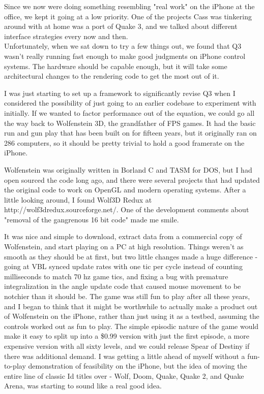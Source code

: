 Since we now were doing something resembling "real work" on the iPhone at the office, we kept it going at a low priority.  One of the projects Cass was tinkering around with at home was a port of Quake 3, and we talked about different interface strategies every now and then.\\
Unfortunately, when we sat down to try a few things out, we found that Q3 wasn't really running fast enough to make good judgments on iPhone control systems.  The hardware should be capable enough, but it will take some architectural changes to the rendering code to get the most out of it.\\
\par

I was just starting to set up a framework to significantly revise Q3 when I considered the possibility of just going to an earlier codebase to experiment with initially.  If we wanted to factor performance out of the equation, we could go all the way back to Wolfenstein 3D, the grandfather of FPS games.  It had the basic run and gun play that has been built on for fifteen years, but it originally ran on 286 computers, so it should be pretty trivial to hold a good framerate on the iPhone.\\
\par

Wolfenstein was originally written in Borland C and TASM for DOS, but I had open sourced the code long ago, and there were several projects that had updated the original code to work on OpenGL and modern operating systems.  After a little looking around, I found Wolf3D Redux at http://wolf3dredux.sourceforge.net/.  One of the development comments about "removal of the gangrenous 16 bit code" made me smile.\\
\par

It was nice and simple to download, extract data from a commercial copy of Wolfenstein, and start playing on a PC at high resolution.  Things weren't as smooth as they should be at first, but two little changes made a huge difference - going at VBL synced update rates with one tic per cycle instead of counting milliseconds to match 70 hz game tics, and fixing a bug with premature integralization in the angle update code that caused mouse movement to be notchier than it should be.  The game was still fun to play after all these years, and I began to think that it might be worthwhile to actually make a product out of Wolfenstein on the iPhone, rather than just using it as a testbed, assuming the controls worked out as fun to play.  The simple episodic nature of the game would make it easy to split up into a \$0.99 version with just the first episode, a more expensive version with all sixty levels, and we could release Spear of Destiny if there was additional demand.  I was getting a little ahead of myself without a fun-to-play demonstration of feasibility on the iPhone, but the idea of moving the entire line of classic Id titles over - Wolf, Doom, Quake, Quake 2, and Quake Arena, was starting to sound like a real good idea.\\
\par

